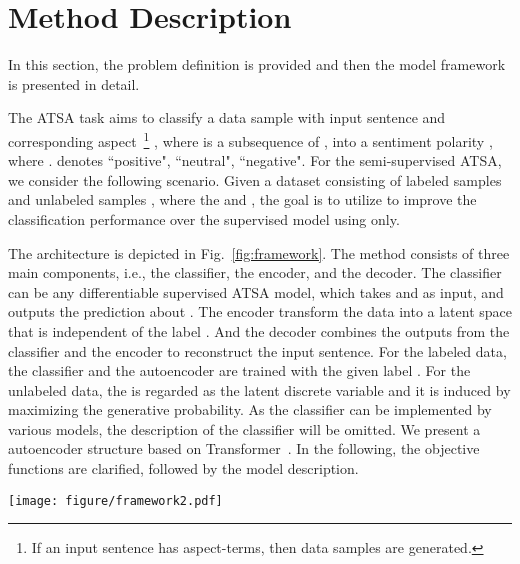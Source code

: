 \documentclass[11pt,a4paper]{article}
\begin{document}
\section{Method Description}
\label{sec:model}
In this section, the problem definition is provided and then the model framework is presented in detail.

The ATSA task aims to classify a data sample with input sentence  and corresponding aspect~\footnote{If an input sentence has  aspect-terms, then  data samples are generated.} , where  is a subsequence of , into a sentiment polarity , where .
 denotes ``positive", ``neutral", ``negative".
For the semi-supervised ATSA, we consider the following scenario.
Given a dataset consisting of labeled samples  and unlabeled samples , where the   and , the goal is to utilize  to improve the classification performance over the supervised model using  only.

The architecture is depicted in Fig.~\ref{fig:framework}.
The method consists of three main components, i.e., the classifier, the encoder, and the decoder.	
The classifier can be any differentiable supervised ATSA model, which takes  and  as input, and outputs the prediction about .
The encoder transform the data into a latent space that is independent of the label .
And the decoder combines the outputs from the classifier and the encoder to reconstruct the input sentence.
For the labeled data, the classifier and the autoencoder are trained with the given label .
For the unlabeled data, the  is regarded as the latent discrete variable and it is induced by maximizing the generative probability.
As the classifier can be implemented by various models, the description of the classifier will be omitted.
We present a autoencoder structure based on Transformer~\cite{DBLP:conf/nips/VaswaniSPUJGKP17}. In the following, the objective functions are clarified, followed by the model description.

\begin{figure*}
	\centering
	\texttt{[image: figure/framework2.pdf]}
	\caption{This is the sketch of our model with bidirectional encoder and decoder. Assuming the aspect-term starts at the -th position in .
		{\bf Bottom}: When using unlabeled data, the distribution of  is provided by the classifier.
		{\bf Left}: The sequence is encoded by a Transformer block, which receives the summation of three embeddings, i.e., segment (used to distinguish aspect words) , position  and word . The encoding and the label  are used to parameterize the posterior .
		{\bf Right}: A sample  from the posterior  and label  are passed to the generative network which estimates the probability  by two unidirectional Transformer decoders. The number of aspect tokens is .
	}
	\label{fig:framework}
\end{figure*}
\end{document}
